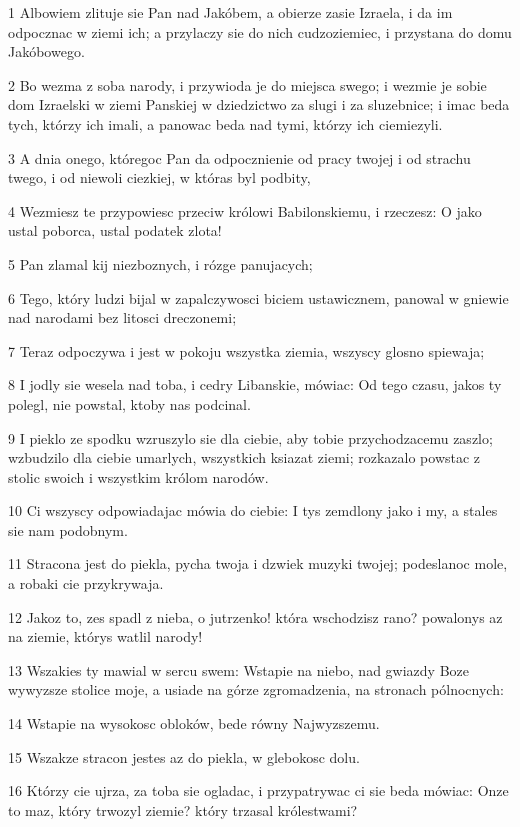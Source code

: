 \par 1 Albowiem zlituje sie Pan nad Jakóbem, a obierze zasie Izraela, i da im odpocznac w ziemi ich; a przylaczy sie do nich cudzoziemiec, i przystana do domu Jakóbowego.
\par 2 Bo wezma z soba narody, i przywioda je do miejsca swego; i wezmie je sobie dom Izraelski w ziemi Panskiej w dziedzictwo za slugi i za sluzebnice; i imac beda tych, którzy ich imali, a panowac beda nad tymi, którzy ich ciemiezyli.
\par 3 A dnia onego, któregoc Pan da odpocznienie od pracy twojej i od strachu twego, i od niewoli ciezkiej, w któras byl podbity,
\par 4 Wezmiesz te przypowiesc przeciw królowi Babilonskiemu, i rzeczesz: O jako ustal poborca, ustal podatek zlota!
\par 5 Pan zlamal kij niezboznych, i rózge panujacych;
\par 6 Tego, który ludzi bijal w zapalczywosci biciem ustawicznem, panowal w gniewie nad narodami bez litosci dreczonemi;
\par 7 Teraz odpoczywa i jest w pokoju wszystka ziemia, wszyscy glosno spiewaja;
\par 8 I jodly sie wesela nad toba, i cedry Libanskie, mówiac: Od tego czasu, jakos ty polegl, nie powstal, ktoby nas podcinal.
\par 9 I pieklo ze spodku wzruszylo sie dla ciebie, aby tobie przychodzacemu zaszlo; wzbudzilo dla ciebie umarlych, wszystkich ksiazat ziemi; rozkazalo powstac z stolic swoich i wszystkim królom narodów.
\par 10 Ci wszyscy odpowiadajac mówia do ciebie: I tys zemdlony jako i my, a stales sie nam podobnym.
\par 11 Stracona jest do piekla, pycha twoja i dzwiek muzyki twojej; podeslanoc mole, a robaki cie przykrywaja.
\par 12 Jakoz to, zes spadl z nieba, o jutrzenko! która wschodzisz rano? powalonys az na ziemie, którys watlil narody!
\par 13 Wszakies ty mawial w sercu swem: Wstapie na niebo, nad gwiazdy Boze wywyzsze stolice moje, a usiade na górze zgromadzenia, na stronach pólnocnych:
\par 14 Wstapie na wysokosc obloków, bede równy Najwyzszemu.
\par 15 Wszakze stracon jestes az do piekla, w glebokosc dolu.
\par 16 Którzy cie ujrza, za toba sie ogladac, i przypatrywac ci sie beda mówiac: Onze to maz, który trwozyl ziemie? który trzasal królestwami?
